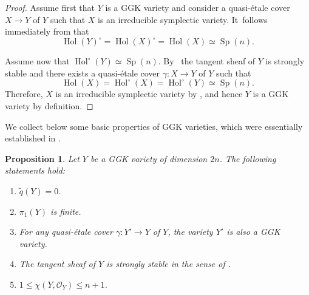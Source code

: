 \documentclass[JEP,XML,SOM,Unicode,published]{cedram}
\theoremstyle{plain}
\newtheorem{prop}[thm]{Proposition}
\theoremstyle{definition}
\newcommand{\OO}{\mathcal{O}}
\DeclareMathOperator{\Hol}{Hol}
\DeclareMathOperator{\Sp}{Sp}
\begin{document}
\begin{proof}
Assume first that $Y$ is a GGK variety and consider a quasi-étale cover $X \to Y$ of $Y$ such that $X$ is an irreducible symplectic variety. It~follows immediately from \cite[Rem.\,5.2 \& Prop.\,F, (F.4)--(F.6)]{GGK19} that\vspace*{-3pt}\enlargethispage{.5\baselineskip}
\[
\Hol(Y)^\circ = \Hol(X)^\circ = \Hol(X) \simeq \Sp(n).
\]

Assume now that $\Hol^\circ(Y) \simeq \Sp(n)$. By~\cite[Th.\,12.1]{GGK19} the tangent sheaf of $Y$ is strongly stable and there exists a quasi-étale cover $\gamma \colon X \to Y$ of $Y$ such that\vspace*{-3pt}
\[
\Hol(X) = \Hol^\circ(X) = \Hol^\circ(Y) \simeq \Sp(n).
\]
Therefore, $X$ is an irreducible symplectic variety by \cite[Prop.\,F, (F.4)--(F.6)]{GGK19}, and hence $Y$ is a GGK variety by definition.
\end{proof}

We collect below some basic properties of GGK varieties, which were essentially established in \cite{GKP16b,GGK19}.

\begin{prop}
\label{prop:basic_prop_GGK}
Let $Y$ be a GGK variety of dimension $2n$. The following statements hold:\vspace*{-3pt}
\begin{enumerate}
\item\label{prop:basic_prop_GGKi}
$\widetilde{q}(Y) = 0$.

\item\label{prop:basic_prop_GGKii}
$\pi_1(Y)$ is finite.

\item\label{prop:basic_prop_GGKiii}
For any quasi-étale cover $\gamma \colon Y' \to Y$ of $Y$, the variety $Y'$ is also a GGK variety.

\item\label{prop:basic_prop_GGKiv}
The tangent sheaf of $Y$ is strongly stable in the sense of \cite[Def.\,7.2]{GKP16b}.

\item\label{prop:basic_prop_GGKv}
$1 \leq \chi(Y, \OO_Y) \leq n+1$.
\end{enumerate}
\end{prop}
\end{document}
